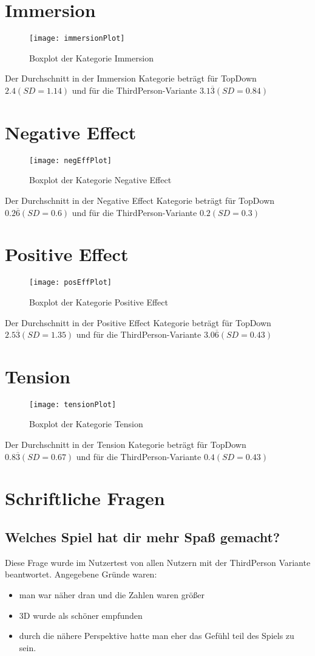 \section{Immersion}
\begin{figure}[h!tb]
	\centering
	\texttt{[image: immersionPlot]}
	\caption{Boxplot der Kategorie Immersion\label{fig:immersionbox}}
\end{figure}
Der Durchschnitt in der Immersion Kategorie beträgt für TopDown  $2.4(SD = 1.14)$ und für die ThirdPerson-Variante $3.1\overline{3}(SD =0.84 )$
\section{Negative Effect}
\begin{figure}[h!tb]
	\centering
	\texttt{[image: negEffPlot]}
	\caption{Boxplot der Kategorie Negative Effect\label{fig:negeffbox}}
\end{figure}
Der Durchschnitt in der Negative Effect Kategorie beträgt für TopDown  $0.2\overline{6}(SD = 0.6)$ und für die ThirdPerson-Variante $0.2(SD =0.3 )$
\section{Positive Effect}
\begin{figure}[htb]
	\centering
	\texttt{[image: posEffPlot]}
	\caption{Boxplot der Kategorie Positive Effect\label{fig:poseffbox}}
\end{figure}
Der Durchschnitt in der Positive Effect Kategorie beträgt für TopDown  $2.5\overline{3}(SD = 1.35)$ und für die ThirdPerson-Variante $3.0\overline{6}(SD =0.43 )$
\section{Tension}
\begin{figure}[htb]
	\centering
	\texttt{[image: tensionPlot]}
	\caption{Boxplot der Kategorie Tension\label{fig:tensionbox}}
\end{figure}
Der Durchschnitt in der Tension Kategorie beträgt für TopDown  $0.8\overline{3}(SD = 0.67)$ und für die ThirdPerson-Variante $0.4(SD =0.43 )$
\section{Schriftliche Fragen}
\subsection{Welches Spiel hat dir mehr Spaß gemacht?}
Diese Frage wurde im Nutzertest von allen Nutzern mit der ThirdPerson Variante beantwortet. Angegebene Gründe waren:
\begin{itemize}
\item man war näher dran und die Zahlen waren größer
\item 3D wurde als schöner empfunden
\item durch die nähere Perspektive hatte man eher das Gefühl teil des Spiels zu sein.
\end{itemize}
